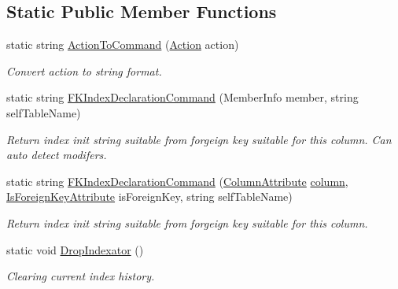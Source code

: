 \subsection*{Static Public Member Functions}
\begin{DoxyCompactItemize}
\item 
static string \mbox{\hyperlink{class_uniform_data_operator_1_1_sql_1_1_markup_1_1_is_foreign_key_attribute_adaff7734b94478d0b37cc8659a0c2acd}{Action\+To\+Command}} (\mbox{\hyperlink{class_uniform_data_operator_1_1_sql_1_1_markup_1_1_is_foreign_key_attribute_ae6c77deaf80d5c4d07709edf51eaebc5}{Action}} action)
\begin{DoxyCompactList}\small\item\em Convert action to string format. \end{DoxyCompactList}\item 
static string \mbox{\hyperlink{class_uniform_data_operator_1_1_sql_1_1_markup_1_1_is_foreign_key_attribute_abd2895acf461357533df2802681cfdc6}{F\+K\+Index\+Declaration\+Command}} (Member\+Info member, string self\+Table\+Name)
\begin{DoxyCompactList}\small\item\em Return index init string suitable from forgeign key suitable for this column. Can auto detect modifers. \end{DoxyCompactList}\item 
static string \mbox{\hyperlink{class_uniform_data_operator_1_1_sql_1_1_markup_1_1_is_foreign_key_attribute_a8a30669fa1f999d6d08cc042f707091c}{F\+K\+Index\+Declaration\+Command}} (\mbox{\hyperlink{class_uniform_data_operator_1_1_sql_1_1_markup_1_1_column_attribute}{Column\+Attribute}} \mbox{\hyperlink{class_uniform_data_operator_1_1_sql_1_1_markup_1_1_is_foreign_key_attribute_aa305b69f1eac8e7335b9776b5d30625e}{column}}, \mbox{\hyperlink{class_uniform_data_operator_1_1_sql_1_1_markup_1_1_is_foreign_key_attribute}{Is\+Foreign\+Key\+Attribute}} is\+Foreign\+Key, string self\+Table\+Name)
\begin{DoxyCompactList}\small\item\em Return index init string suitable from forgeign key suitable for this column. \end{DoxyCompactList}\item 
static void \mbox{\hyperlink{class_uniform_data_operator_1_1_sql_1_1_markup_1_1_is_foreign_key_attribute_abec2624118cb8518ddac018eb4bff213}{Drop\+Indexator}} ()
\begin{DoxyCompactList}\small\item\em Clearing current index history. \end{DoxyCompactList}\item 

\end{DoxyCompactItemize}
